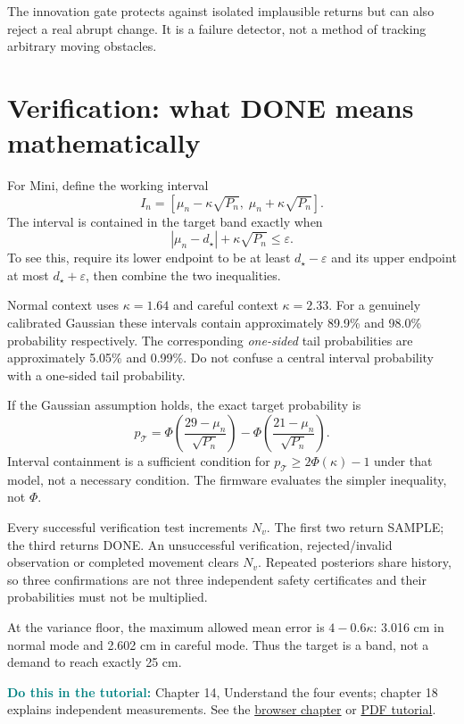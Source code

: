 \documentclass[11pt,a4paper]{article}
\newcommand{\tuto}[2]{\par\textcolor{teal}{\textbf{Do this in the tutorial:}} Chapter #1, #2. See the \href{Tutorial_A_to_Z.html\#t#1}{browser chapter} or \href{Tutorial_A_to_Z.pdf}{PDF tutorial}.\par}
\begin{document}
The innovation gate protects against isolated implausible returns but can also reject a real abrupt change. It is a failure detector, not a method of tracking arbitrary moving obstacles.

\section{Verification: what DONE means mathematically}
For Mini, define the working interval
\begin{equation}
 I_n=[\mu_n-\kappa\sqrt{P_n},\;\mu_n+\kappa\sqrt{P_n}].
\end{equation}
The interval is contained in the target band exactly when
\begin{equation}\label{eq:verify}
 |\mu_n-d_\star|+\kappa\sqrt{P_n}\leq\varepsilon.
\end{equation}
To see this, require its lower endpoint to be at least $d_\star-\varepsilon$ and its upper endpoint at most $d_\star+\varepsilon$, then combine the two inequalities.

Normal context uses $\kappa=1.64$ and careful context $\kappa=2.33$. For a genuinely calibrated Gaussian these intervals contain approximately 89.9\% and 98.0\% probability respectively. The corresponding \emph{one-sided} tail probabilities are approximately 5.05\% and 0.99\%. Do not confuse a central interval probability with a one-sided tail probability.

If the Gaussian assumption holds, the exact target probability is
\begin{equation}
 p_{\mathcal T}=\Phi\left(\frac{29-\mu_n}{\sqrt{P_n}}\right)-
 \Phi\left(\frac{21-\mu_n}{\sqrt{P_n}}\right).
\end{equation}
Interval containment is a sufficient condition for $p_{\mathcal T}\geq2\Phi(\kappa)-1$ under that model, not a necessary condition. The firmware evaluates the simpler inequality, not $\Phi$.

Every successful verification test increments $N_v$. The first two return SAMPLE; the third returns DONE. An unsuccessful verification, rejected/invalid observation or completed movement clears $N_v$. Repeated posteriors share history, so three confirmations are not three independent safety certificates and their probabilities must not be multiplied.

At the variance floor, the maximum allowed mean error is $4-0.6\kappa$: 3.016 cm in normal mode and 2.602 cm in careful mode. Thus the target is a band, not a demand to reach exactly 25 cm.
\tuto{14}{Understand the four events; chapter 18 explains independent measurements}
\end{document}
